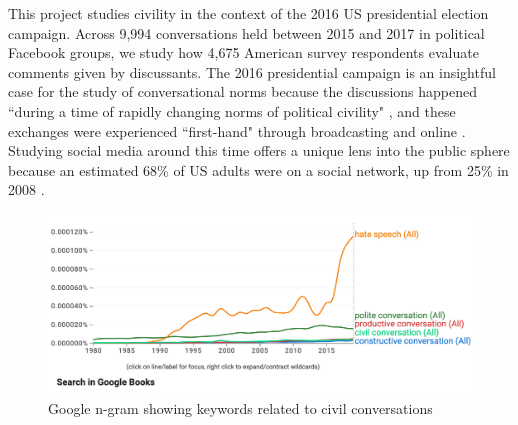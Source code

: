 \documentclass{article}
\begin{document}
This project studies civility in the context of the 2016 US presidential election campaign. Across 9,994 conversations held between 2015 and 2017 in political Facebook groups, we study how 4,675 American survey respondents evaluate comments given by discussants. The 2016 presidential campaign is an insightful case for the study of conversational norms because the discussions happened ``during a time of rapidly changing norms of political civility" \citep{munger_dont_2021}, and these exchanges were experienced ``first-hand" through broadcasting and online \citep{mutz_inyourface_2016}. Studying social media around this time offers a unique lens into the public sphere because an estimated 68\% of US adults were on a social network, up from 25\% in 2008 \citep{duggan_social_2016}. 





\begin{figure}
    \centering
    \includegraphics[width=1\linewidth]{figures/ngram.png}
    \caption{Google n-gram showing keywords related to civil conversations}
    \label{fig:n-gram}
\end{figure}
\end{document}
